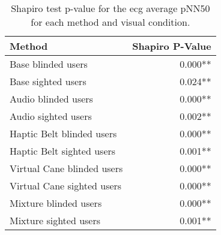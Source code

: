
\begin{table}[!htb]
\centering
\caption{Shapiro test p-value for the ecg average pNN50 for each method and visual condition.}
\label{tab:shapiro_ecg_pnn50}
\begin{tabular}{lr}
\toprule
                    Method & Shapiro P-Value \\
\midrule
        Base blinded users &         0.000** \\
        Base sighted users &         0.024** \\
       Audio blinded users &         0.000** \\
       Audio sighted users &         0.002** \\
 Haptic Belt blinded users &         0.000** \\
 Haptic Belt sighted users &         0.001** \\
Virtual Cane blinded users &         0.000** \\
Virtual Cane sighted users &         0.000** \\
     Mixture blinded users &         0.000** \\
     Mixture sighted users &         0.001** \\
\bottomrule
\end{tabular}
\end{table}

